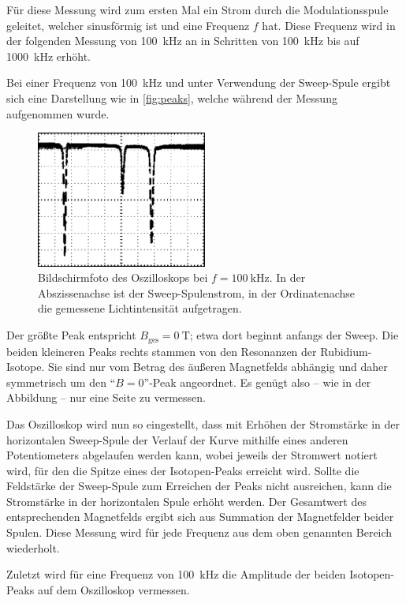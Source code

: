     Für diese Messung wird zum ersten Mal ein Strom durch die Modulationsspule geleitet,
    welcher sinusförmig ist und eine Frequenz $f$ hat.
    Diese Frequenz wird in der folgenden Messung von \SI{100}{\kilo\hertz} an in Schritten von \SI{100}{\kilo\hertz} bis auf \SI{1000}{\kilo\hertz} erhöht.

    Bei einer Frequenz von \SI{100}{\kilo\hertz} und unter Verwendung der Sweep-Spule ergibt sich eine Darstellung wie in \autoref{fig:peaks},
    welche während der Messung aufgenommen wurde.
    \begin{figure}[H]
       \centering
       \includegraphics[width=0.5\textwidth]{content/img/oszilloskop1.png}
       \caption{
            Bildschirmfoto des Oszilloskops bei $f = \SI{100}{\kilo\hertz}$.
            In der Abszissenachse ist der Sweep-Spulenstrom, in der Ordinatenachse die gemessene Lichtintensität aufgetragen.
        }
       \label{fig:peaks}
    \end{figure}

    Der größte Peak entspricht $B_\text{ges} = \SI{0}{\tesla}$;
    etwa dort beginnt anfangs der Sweep.
    Die beiden kleineren Peaks rechts stammen von den Resonanzen der Rubidium-Isotope.
    Sie sind nur vom Betrag des äußeren Magnetfelds abhängig und daher symmetrisch um den \enquote{$B=0$}-Peak angeordnet.
    Es genügt also – wie in der Abbildung – nur eine Seite zu vermessen.

    Das Oszilloskop wird nun so eingestellt,
    dass mit Erhöhen der Stromstärke in der horizontalen Sweep-Spule der Verlauf der Kurve mithilfe eines anderen Potentiometers abgelaufen werden kann,
    wobei jeweils der Stromwert notiert wird,
    für den die Spitze eines der Isotopen-Peaks erreicht wird.
    Sollte die Feldstärke der Sweep-Spule zum Erreichen der Peaks nicht ausreichen,
    kann die Stromstärke in der horizontalen Spule erhöht werden.
    Der Gesamtwert des entsprechenden Magnetfelds ergibt sich aus Summation der Magnetfelder beider Spulen.
    Diese Messung wird für jede Frequenz aus dem oben genannten Bereich wiederholt.

    Zuletzt wird für eine Frequenz von \SI{100}{\kilo\hertz} die Amplitude der beiden Isotopen-Peaks auf dem Oszilloskop vermessen.
